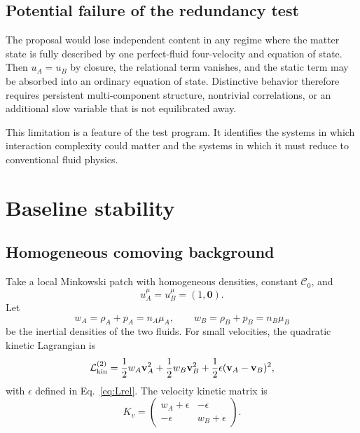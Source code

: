 \documentclass[11pt]{article}
\newcommand{\Lag}{\mathcal L}
\begin{document}
\subsection{Potential failure of the redundancy test}

The proposal would lose independent content in any regime where the matter state is fully described by one perfect-fluid four-velocity and equation of state.  Then $u_A=u_B$ by closure, the relational term vanishes, and the static term may be absorbed into an ordinary equation of state.  Distinctive behavior therefore requires persistent multi-component structure, nontrivial correlations, or an additional slow variable that is not equilibrated away.

This limitation is a feature of the test program.  It identifies the systems in which interaction complexity could matter and the systems in which it must reduce to conventional fluid physics.

\section{Baseline stability}

\subsection{Homogeneous comoving background}

Take a local Minkowski patch with homogeneous densities, constant $\mathcal C_0$, and
\begin{equation}
u_A^\mu=u_B^\mu=(1,\mathbf 0).
\label{eq:comovingbackground}
\end{equation}
Let
\begin{equation}
w_A=\rho_A+p_A=n_A\mu_A,
\qquad
w_B=\rho_B+p_B=n_B\mu_B
\label{eq:enthalpies}
\end{equation}
be the inertial densities of the two fluids.  For small velocities, the quadratic kinetic Lagrangian is
\begin{equation}
\Lag_{\rm kin}^{(2)}
=\frac12w_A\mathbf v_A^2
+\frac12w_B\mathbf v_B^2
+\frac12\epsilon(\mathbf v_A-\mathbf v_B)^2,
\label{eq:kineticL}
\end{equation}
with $\epsilon$ defined in Eq.~\eqref{eq:Lrel}.  The velocity kinetic matrix is
\begin{equation}
K_v=
\begin{pmatrix}
w_A+\epsilon & -\epsilon\\
-\epsilon & w_B+\epsilon
\end{pmatrix}.
\label{eq:Kv}
\end{equation}
\end{document}
